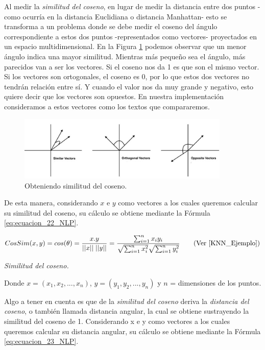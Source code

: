 \documentclass[12pt,a4paper]{article}
\begin{document}
\begin{sloppypar}
Al medir la \textit{similitud del coseno}, en lugar de medir la distancia entre dos puntos -como ocurría en la distancia Euclidiana o distancia Manhattan- esto se transforma a un problema donde se debe medir el coseno del ángulo correspondiente a estos dos puntos -representados como vectores- proyectados en un espacio multidimensional. En la Figura \ref{fig:Imagen_NLP_34} podemos observar que un menor ángulo indica una mayor similitud. Mientras más pequeño sea el ángulo, más parecidos van a ser los vectores. Si el coseno nos da 1 es que son el mismo vector. Si los vectores son ortogonales, el coseno es 0, por lo que estos dos vectores no tendrán relación entre sí. Y cuando el valor nos da muy grande y negativo, esto quiere decir que los vectores son opuestos. En nuestra implementación consideramos a estos vectores como los textos que compararemos.

\begin{figure}[H]    
 \centering
 \includegraphics[width=0.9\textwidth]{images/NLP/34.png}
 \caption{Obteniendo similitud del coseno.}
 \label{fig:Imagen_NLP_34}
\end{figure}

De esta manera, considerando $x$ e $y$ como vectores a los cuales queremos calcular su similitud del coseno, su cálculo se obtiene mediante la Fórmula \ref{eq:ecuacion_22_NLP}.

\begin{equation}\label{eq:ecuacion_22_NLP}
CosSim(x,y) = cos(\theta) = \frac{x . y}{ {||x|| \; ||y||} } = \frac{\sum_{i=1}^{n} x_{i} y_{i}}{\sqrt{\sum_{i=1}^{n} x_{i}^{2}} \sqrt{\sum_{i=1}^{n} y_{i}^{2}} }    \qquad \text{(Ver \cite{KNN_Ejemplo})}
\end{equation}
\begin{center}
\textit{Similitud del coseno.}
\end{center}

Donde $x= (x_1,x_2,..., x_n)$, $y = (y_1,y_2,...,y_n)$ y $n$ = dimensiones de los puntos.

Algo a tener en cuenta es que de la \textit{similitud del coseno} deriva la \textit{distancia del coseno}, o también llamada distancia angular, la cual se obtiene sustrayendo la similitud del coseno de 1. Considerando x e y como vectores a los cuales queremos calcular su distancia angular, su cálculo se obtiene mediante la Fórmula \ref{eq:ecuacion_23_NLP}.


\end{sloppypar}
\end{document}
